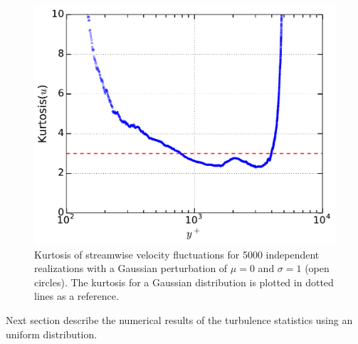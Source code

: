 \documentclass[aps,reprint,amsmath,amssymb,pra]{revtex4-1}%
\begin{document}
\begin{figure}[tb] 
\includegraphics[scale=0.46]{figures/kurtosis_5000_assembles_gauss100}
\caption{\label{fig:kurtgaus100} Kurtosis of streamwise velocity fluctuations for 5000 independent realizations with a Gaussian perturbation of $\mu=0$ and $\sigma=1$ (open circles). The kurtosis for a Gaussian distribution is plotted in dotted lines as a reference.}
\end{figure}
Next section describe the numerical results of the turbulence statistics using an uniform distribution.
\end{document}
